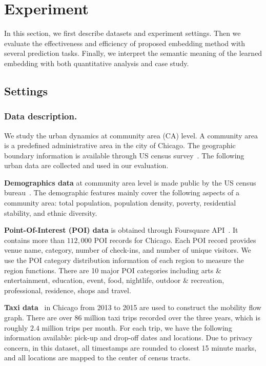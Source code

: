 \section{Experiment}
\label{sec:experiments}

\newcommand{\dgef}{$DGE_{flow}$\xspace}
\newcommand{\dges}{$DGE_{spatial}$\xspace}
\newcommand{\hdge}{$HDGE$\xspace}

In this section, we first describe datasets and experiment settings. Then we evaluate the effectiveness and efficiency of proposed embedding method with several prediction tasks. Finally, we interpret the semantic meaning of the learned embedding with both quantitative analysis and case study.


\subsection{Settings}

\subsubsection{Data description.} We study the urban dynamics at community area (CA) level. A community area is a predefined administrative area in the city of Chicago. The geographic boundary information is available through US census survey~\cite{data-census}. The following urban data are collected and used in our evaluation.

\textbf{Demographics data} at community area level is made public by the US census bureau~\cite{data-census}. The demographic features mainly cover the following aspects of a community area: total population, population density, poverty, residential stability, and ethnic diversity.

\textbf{Point-Of-Interest (POI) data} is obtained through Foursquare API~\cite{data-poi}. It contains more than $112,000$ POI records for Chicago. Each POI record provides venue name, category, number of check-ins, and number of unique visitors. We use the POI category distribution information of each region to measure the region functions. There are 10 major POI categories including arts \& entertainment, education, event, food, nightlife, outdoor \& recreation, professional, residence, shops and travel.

\textbf{Taxi data}~\cite{data-taxi} in Chicago from 2013 to 2015 are used to construct the mobility flow graph. There are over $86$ million taxi trips recorded over the three years, which is roughly $2.4$ million trips per month. For each trip, we have the following information available: pick-up and drop-off dates and locations. Due to privacy concern, in this dataset, all timestamps are rounded to closest 15 minute marks, and all locations are mapped to the center of census tracts.

